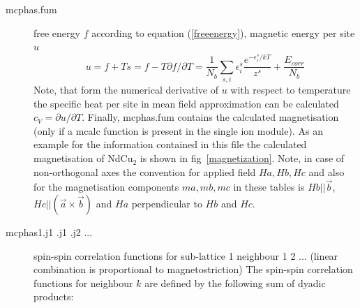 \begin{description}
\item [\prg mcphas.fum]    free energy $f$ according to equation (\ref{freeenergy}), magnetic energy per site $u$
\begin{equation}
u=f+Ts=f-T\partial f/\partial T=\frac{1}{N_b}\sum_{s,i} \epsilon^s_i \frac{e^{-\epsilon^s_i/kT}}{z^s}+\frac{E_{corr}}{N_b}
\end{equation}
                            Note, that form the numerical derivative of $u$ with respect to temperature 
                             the specific heat per site in mean field approximation can be calculated $c_V=\partial u/\partial T$.
                           Finally, {\prg mcphas.fum} contains the calculated
                           magnetisation  (only if a {\prg mcalc} function is present in the single ion module).
                            As an example for the information
			   contained in this file the calculated magnetisation  of NdCu$_2$ is shown in
			   fig~\ref{magnetization}.
                            Note, in case of non-orthogonal axes the convention for applied field $Ha, Hb,Hc$ and
                            also for the magnetisation components $ma,mb,mc$ in these tables 
                            is $Hb||\vec b$, $Hc||(\vec a \times \vec b)$ and $Ha$ perpendicular to $Hb$ and $Hc$.

\item [\prg mcphas1.j1 .j1 .j2 ...] 
               spin-spin correlation functions for sub-lattice 1 neighbour 1 2 ...
	       (linear combination is proportional to magnetostriction)
	       The spin-spin correlation functions for neighbour $k$ are defined by
	       the following sum of dyadic products:


\end{description}
